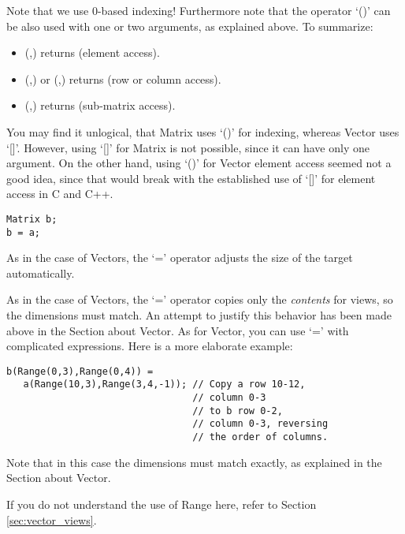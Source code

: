 Note that we use 0-based indexing! Furthermore note that the operator
`()' can be also used with one or two  arguments, as
explained above. To summarize:

\begin{itemize}
\item (,) returns  (element access).
\item (,) or (,) returns
   (row or column access).
\item (,) returns 
  (sub-matrix access).
\end{itemize}

You may find it unlogical, that Matrix uses `()' for indexing, whereas
Vector uses `[]'. However, using `[]' for Matrix is not possible,
since it can have only one argument. On the other hand, using `()' for
Vector element access seemed not a good idea, since that would break
with the established use of `[]' for element access in C and C++.

\begin{verbatim}
Matrix b;
b = a;
\end{verbatim}

As in the case of Vectors, the `=' operator adjusts the size of the
target automatically.


As in the case of Vectors, the `=' operator copies only the
\emph{contents} for views, so the dimensions must match. An attempt to justify
this behavior has been made above in the Section about Vector. As for
Vector, you can use `=' with complicated expressions. Here is a more
elaborate example:

\begin{verbatim}
b(Range(0,3),Range(0,4)) =
   a(Range(10,3),Range(3,4,-1)); // Copy a row 10-12,
                                 // column 0-3 
                                 // to b row 0-2,
                                 // column 0-3, reversing
                                 // the order of columns.
\end{verbatim}
Note that in this case the dimensions must match exactly, as explained
in the Section about Vector.

If you do not understand the use of Range here, refer to Section
\ref{sec:vector_views}. 

